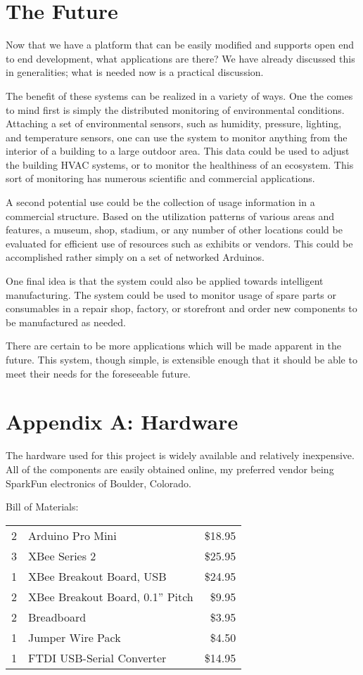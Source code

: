 \documentclass[a4paper,10pt]{article}
\begin{document}
\section{The Future}
Now that we have a platform that can be easily modified and supports open
end to end development, what applications are there? We have already discussed
this in generalities; what is needed now is a practical discussion. 

The benefit of these systems can be realized in a variety of ways. One the comes
to mind first is simply the distributed monitoring of environmental
conditions. Attaching a set of environmental sensors, such as humidity,
pressure, lighting, and temperature sensors, one can use the system to monitor
anything from the interior of a building to a large outdoor area. This data
could be used to adjust the building HVAC systems, or to monitor the healthiness
of an ecosystem. This sort of monitoring has numerous scientific and commercial
applications.

A second potential use could be the collection of usage information in a
commercial structure. Based on the utilization patterns of various areas and
features, a museum, shop, stadium, or any number of other locations could be
evaluated for efficient use of resources such as exhibits or vendors. This could
be accomplished rather simply on a set of networked Arduinos. 

One final idea is that the system could also be applied towards intelligent
manufacturing. The system could be used to monitor usage of spare parts or
consumables in a repair shop, factory, or storefront and order new components to
be manufactured as needed.

There are certain to be more applications which will be made apparent in the
future. This system, though simple, is extensible enough that it should be able
to meet their needs for the foreseeable future.

\section{Appendix A: Hardware}
The hardware used for this project is widely available and relatively
inexpensive. All of the components are easily obtained online, my preferred
vendor being SparkFun electronics of Boulder, Colorado. 

Bill of Materials:

\begin{tabular}{l l r}
2 & Arduino Pro Mini & \$18.95 \\
3 & XBee Series 2 & \$25.95 \\
1 & XBee Breakout Board, USB & \$24.95 \\
2 & XBee Breakout Board, 0.1'' Pitch & \$9.95 \\
2 & Breadboard & \$3.95 \\
1 & Jumper Wire Pack & \$4.50 \\
1 & FTDI USB-Serial Converter & \$14.95
\end{tabular}
\end{document}
